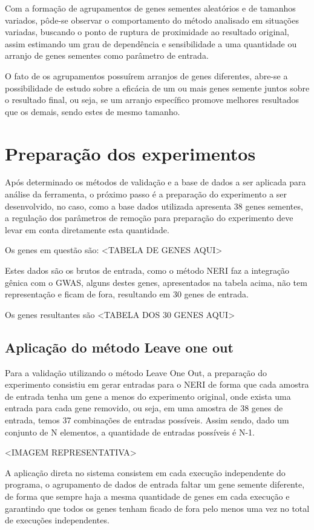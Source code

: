 Com a formação de agrupamentos de genes sementes aleatórios e de tamanhos variados, pôde-se observar o comportamento do método analisado em situações variadas, buscando o ponto de ruptura de proximidade ao resultado original, assim estimando um grau de dependência e sensibilidade a uma quantidade ou arranjo de genes sementes como parâmetro de entrada.

O fato de os agrupamentos possuírem arranjos de genes diferentes, abre-se a possibilidade de estudo sobre a eficácia de um ou mais genes semente juntos sobre o resultado final, ou seja, se um arranjo específico promove melhores resultados que os demais, sendo estes de mesmo tamanho.

\section{Preparação dos experimentos}

Após determinado os métodos de validação e a base de dados a ser aplicada para análise da ferramenta, o próximo passo é a preparação do experimento a ser desenvolvido, no caso, como a base dados utilizada apresenta 38 genes sementes, a regulação dos parâmetros de remoção para preparação do experimento deve levar em conta diretamente esta quantidade.

Os genes em questão são:
<TABELA DE GENES AQUI>

Estes dados são os brutos de entrada, como o método NERI faz a integração gênica com o GWAS, alguns destes genes, apresentados na tabela acima, não tem representação e ficam de fora, resultando em 30 genes de entrada.

Os genes resultantes são
<TABELA DOS 30 GENES AQUI>

\subsection{Aplicação do método Leave one out}

Para a validação utilizando o método Leave One Out, a preparação do experimento consistiu em gerar entradas para o NERI de forma que cada amostra de entrada tenha um gene a menos do experimento original, onde exista uma entrada para cada gene removido, ou seja, em uma amostra de 38 genes de entrada, temos 37 combinações de entradas possíveis. 
Assim sendo, dado um conjunto de N elementos, a quantidade de entradas possíveis é N-1.

<IMAGEM REPRESENTATIVA>

A aplicação direta no sistema consistem em cada execução independente do programa, o agrupamento de dados de entrada faltar um gene semente diferente, de forma que sempre haja a mesma quantidade de genes em cada execução e garantindo que todos os genes tenham ficado de fora pelo menos uma vez no total de execuções independentes.

